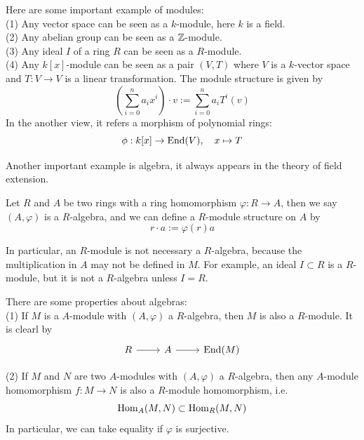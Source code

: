 \documentclass[12pt,a4paper]{article}
\begin{document}
\begin{example}
    Here are some important example of modules:\\
    (1) Any vector space can be seen as a \(k\)-module, here \(k\) is a field.\\

    (2) Any abelian group can be seen as a \(\mathbb{Z}\)-module. \\

    (3) Any ideal \(I\) of a ring \(R\) can be seen as a \(R\)-module.\\

    (4) Any \(k[x]\)-module can be seen as a pair \((V,T)\) where \(V\) is a \(k\)-vector space and \(T: V \to V\) is a linear transformation. The module structure is given by
    \[(\sum_{i=0}^n a_i x^i) \cdot v := \sum_{i=0}^n a_i T^i(v)\]
    In the another view, it refers a morphism of polynomial rings:
    \[\phi: k[x] \to \operatorname{End}(V), \quad x \mapsto T\]
\end{example}

Another important example is algebra, it always appears in the theory of field extension.
\begin{definitionplain}
    Let \(R\) and \(A\) be two rings with a ring homomorphism \(\varphi: R \to A\), then we say \((A, \varphi)\) is a \(R\)-algebra, and we can define a \(R\)-module structure on \(A\) by
    \[r \cdot a := \varphi(r)a\]
    
\end{definitionplain}

\begin{remark}
    In particular, an \(R\)-module is not necessary a \(R\)-algebra, because the multiplication in \(A\) may not be defined in \(M\). For example, an ideal \(I \subset R\) is a \(R\)-module, but it is not a \(R\)-algebra unless \(I = R\).

    There are some properties about algebras:\\

    (1) If \(M\) is a \(A\)-module with \((A, \varphi)\) a \(R\)-algebra, then \(M\) is also a \(R\)-module. It is clearl by 
\[\begin{tikzcd}
    R & A & {\End(M)}
    \arrow[from=1-1, to=1-2]
    \arrow[from=1-2, to=1-3]
\end{tikzcd}\]

(2) If \(M\) and \(N\) are two \(A\)-modules with \((A, \varphi)\) a \(R\)-algebra, then any \(A\)-module homomorphism \(f: M \to N\) is also a \(R\)-module homomorphism, i.e.
\[\operatorname{Hom}_{A}(M,N) \subset \operatorname{Hom}_{R}(M,N)\]
In particular, we can take equality if \(\varphi\) is surjective.
\end{remark}
\end{document}
